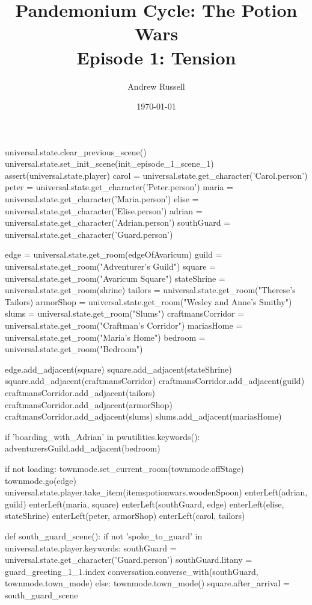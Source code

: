 \documentclass{book}
\title{Pandemonium Cycle: The Potion Wars \\ Episode 1: Tension}
\author{Andrew Russell}
\date{\today}
\begin{document}
\maketitle
\begin{openScene}
    universal.state.clear_previous_scene()
    universal.state.set_init_scene(init_episode_1_scene_1)
    assert(universal.state.player)
    carol = universal.state.get_character('Carol.person')
    peter = universal.state.get_character('Peter.person')
    maria = universal.state.get_character('Maria.person')
    elise = universal.state.get_character('Elise.person')
    adrian = universal.state.get_character('Adrian.person')
    southGuard = universal.state.get_character('Guard.person')
    
    edge = universal.state.get_room(edgeOfAvaricum)
    guild = universal.state.get_room("Adventurer's Guild")
    square = universal.state.get_room("Avaricum Square")
    stateShrine = universal.state.get_room(shrine)
    tailors = universal.state.get_room("Therese's Tailors)
    armorShop = universal.state.get_room("Wesley and Anne's Smithy")
    slums = universal.state.get_room("Slums")
    craftmansCorridor = universal.state.get_room("Craftman's Corridor")
    mariasHome = universal.state.get_room("Maria's Home")
    bedroom = universal.state.get_room("Bedroom")

    edge.add_adjacent(square)
    square.add_adjacent(stateShrine)
    square.add_adjacent(craftmansCorridor)
    craftmansCorridor.add_adjacent(guild)
    craftmansCorridor.add_adjacent(tailors)
    craftmansCorridor.add_adjacent(armorShop)
    craftmansCorridor.add_adjacent(slums)
    slums.add_adjacent(mariasHome)

    if 'boarding\_with\_Adrian' in pwutilities.keywords():
        adventurersGuild.add_adjacent(bedroom)

    if not loading:
        townmode.set_current_room(townmode.offStage)
        townmode.go(edge)
        universal.state.player.take_item(itemspotionwars.woodenSpoon)
        enterLeft(adrian, guild)
        enterLeft(maria, square)
        enterLeft(southGuard, edge)
        enterLeft(elise, stateShrine)
        enterLeft(peter, armorShop)
        enterLeft(carol, tailors)

    def south_guard_scene(): 
        if not 'spoke_to_guard' in universal.state.player.keywords:
            southGuard = universal.state.get_character('Guard.person')
            southGuard.litany = guard_greeting_1_1.index
            conversation.converse_with(southGuard, townmode.town_mode)
        else:
            townmode.town_mode()
    square.after_arrival = south_guard_scene

\end{openScene}
\end{document}
